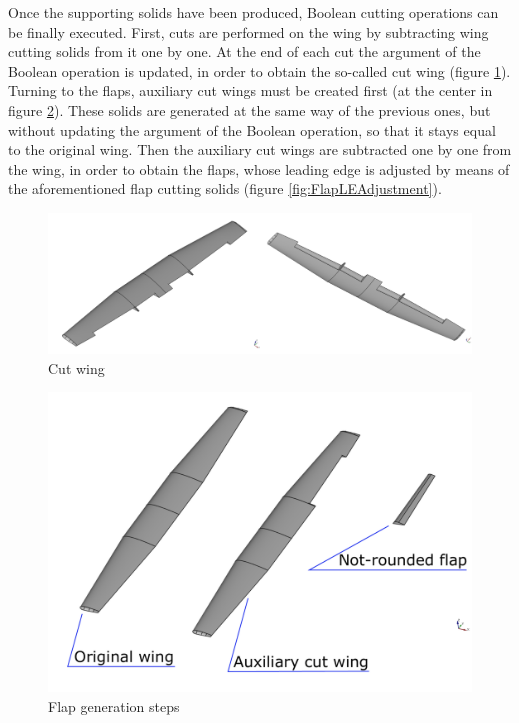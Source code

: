 \bigskip
\noindent
Once the supporting solids have been produced, Boolean cutting operations can be finally executed. First, cuts are performed on the wing by subtracting wing cutting solids from it one by one. At the end of each cut the argument of the Boolean operation is updated, in order to obtain the so-called cut wing (figure \ref{fig:CutWing}). Turning to the flaps, auxiliary cut wings must be created first (at the center in figure \ref{fig:WingAuxCutWingFlap}). These solids are generated at the same way of the previous ones, but without updating the argument of the Boolean operation, so that it stays equal to the original wing. Then the auxiliary cut wings are subtracted one by one from the wing, in order to obtain the flaps, whose leading edge is adjusted by means of the aforementioned flap cutting solids (figure \ref{fig:FlapLEAdjustment}).
%
\begin{figure}[H]
\centering
\includegraphics[scale=0.52]{Immagini/Appendice/Flap/WingCutSolid_04}
\caption{Cut wing}
\label{fig:CutWing}
\end{figure}
%
\begin{figure}[H]
\centering
\includegraphics[scale=0.50]{Immagini/Appendice/Flap/flap_07}
\caption{Flap generation steps}
\label{fig:WingAuxCutWingFlap}
\end{figure}  
